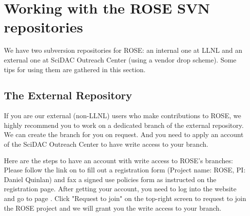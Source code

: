 \section{Working with the ROSE SVN repositories}%
\label{gettingStarted::svn}
We have two subversion repositories for ROSE: an internal one at LLNL and
an external one at SciDAC Outreach Center (using a vendor drop scheme). 
Some tips for using them are gathered in this section. 

\subsection{The External Repository}
If you are our external (non-LLNL) users who make contributions to ROSE,
we highly recommend you to work on a dedicated branch of the external repository. 
We can create the branch for you on request. And you need to apply an account of
the SciDAC Outreach Center to have write access to your branch. 

Here are the steps to have an account with write access to ROSE's branches:
Please follow the link on
to fill out a registration form (Project name: ROSE, PI: Daniel Quinlan)
and fax a signed use policies form as instructed on the registration page.
After getting your account, you need to log into the website and go to page
.
Click "Request to join" on the top-right screen to request to join the ROSE
project and we will grant you the write access to your branch. 

